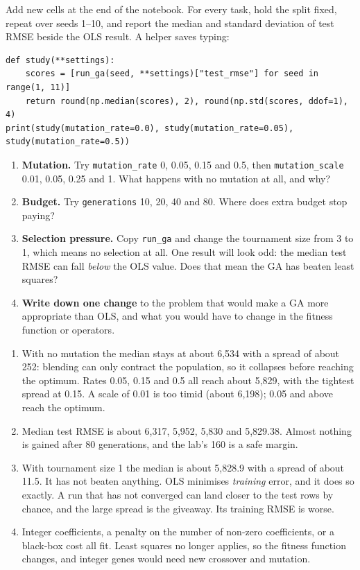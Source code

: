 \begin{yourturn}
Add new cells at the end of the notebook. For every task, hold the split fixed, repeat over seeds 1--10, and report the median and standard deviation of test RMSE beside the OLS result. A helper saves typing:
\begin{lstlisting}[style=utppython]
def study(**settings):
    scores = [run_ga(seed, **settings)["test_rmse"] for seed in range(1, 11)]
    return round(np.median(scores), 2), round(np.std(scores, ddof=1), 4)
print(study(mutation_rate=0.0), study(mutation_rate=0.05), study(mutation_rate=0.5))
\end{lstlisting}
\begin{enumerate}
  \item \textbf{Mutation.} Try \texttt{mutation\_rate} 0, 0.05, 0.15 and 0.5, then \texttt{mutation\_scale} 0.01, 0.05, 0.25 and 1. What happens with no mutation at all, and why?
  \item \textbf{Budget.} Try \texttt{generations} 10, 20, 40 and 80. Where does extra budget stop paying?
  \item \textbf{Selection pressure.} Copy \texttt{run\_ga} and change the tournament size from 3 to 1, which means no selection at all. One result will look odd: the median test RMSE can fall \emph{below} the OLS value. Does that mean the GA has beaten least squares?
  \item \textbf{Write down one change} to the problem that would make a GA more appropriate than OLS, and what you would have to change in the fitness function or operators.
\end{enumerate}
\end{yourturn}

\begin{expectedfindings}
\begin{enumerate}
  \item With no mutation the median stays at about 6,534 with a spread of about 252: blending can only contract the population, so it collapses before reaching the optimum. Rates 0.05, 0.15 and 0.5 all reach about 5,829, with the tightest spread at 0.15. A scale of 0.01 is too timid (about 6,198); 0.05 and above reach the optimum.
  \item Median test RMSE is about 6,317, 5,952, 5,830 and 5,829.38. Almost nothing is gained after 80 generations, and the lab's 160 is a safe margin.
  \item With tournament size 1 the median is about 5,828.9 with a spread of about 11.5. It has not beaten anything. OLS minimises \emph{training} error, and it does so exactly. A run that has not converged can land closer to the test rows by chance, and the large spread is the giveaway. Its training RMSE is worse.
  \item Integer coefficients, a penalty on the number of non-zero coefficients, or a black-box cost all fit. Least squares no longer applies, so the fitness function changes, and integer genes would need new crossover and mutation.
\end{enumerate}
\end{expectedfindings}

